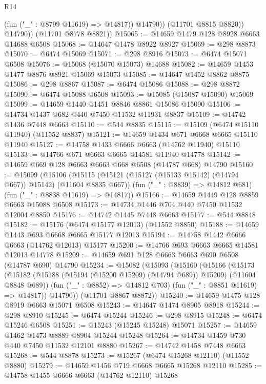\begin{lexlean}{R14}
\begin{coremodule}
                  (fun ("_" : @8799 @11619) => @14817))
                @14790))
            (@11701 @8815 @8820))
          @14790))
      (@11701 @8778 @8821))
@15065 := @14659 @1479 @128 @8928 @6663 @14688 @6508
@15068 := @14647 @1478 @8922 @8927
@15069 := @298 @8873
@15070 := @6474 @15069
@15071 := @298 @8916
@15073 := @6474 @15071 @6508
@15076 := @15068 (@15070 @15073) @14688
@15082 := @14659 @1453 @1477 @8876 @8921 @15069 @15073
@15085 := @14647 @1452 @8862 @8875
@15086 := @298 @8867
@15087 := @6474 @15086
@15088 := @298 @8872
@15090 := @6474 @15088 @6508
@15093 := @15085 (@15087 @15090) @15069
@15099 := @14659 @1440 @1451 @8846 @8861 @15086 @15090
@15106 := @14734 @1437 @682 @440 @7450 @11532 @11931 @8837
@15109 := @14742 @1436 @7448 @6663
@15110 := @544 @8835
@15115 := @15109 (@6474 @15110 @11940) (@11552 @8837)
@15121 := @14659 @1434 @671 @6668 @6665 @15110 @11940
@15127 := @14758 @1433 @6666 @6663 (@14762 @11940) @15110
@15133 := @14766 @671 @6663 @6665 @14581 @11940 @14778
@15142 := @14659 @669 @128 @6663 @6663 @668 @6508 (@14787 @668) @14790
@15160 := @15099
    (@15106
      (@15115 (@15121 (@15127 (@15133 @15142) (@14794 @667)) @15142) (@11604 @8835 @667))
      (fun ("_" : @8839) => @14812 @681)
      (fun ("_" : @8838 @11619) => @14817))
@15166 := @14659 @1449 @128 @8859 @6663 @15088 @6508
@15173 := @14734 @1446 @704 @440 @7450 @11532 @12004 @8850
@15176 := @14742 @1445 @7448 @6663
@15177 := @544 @8848
@15182 := @15176 (@6474 @15177 @12013) (@11552 @8850)
@15188 := @14659 @1443 @693 @6668 @6665 @15177 @12013
@15194 := @14758 @1442 @6666 @6663 (@14762 @12013) @15177
@15200 := @14766 @693 @6663 @6665 @14581 @12013 @14778
@15209 := @14659 @691 @128 @6663 @6663 @690 @6508 (@14787 @690) @14790
@15234 := @15082
    (@15093
      (@15160
        (@15166
          (@15173
            (@15182 (@15188 (@15194 (@15200 @15209) (@14794 @689)) @15209) (@11604 @8848 @689))
            (fun ("_" : @8852) => @14812 @703)
            (fun ("_" : @8851 @11619) => @14817))
          @14790))
      (@11701 @8867 @8872))
@15240 := @14659 @1475 @128 @8919 @6663 @15071 @6508
@15243 := @14647 @1474 @8905 @8918
@15244 := @298 @8910
@15245 := @6474 @15244
@15246 := @298 @8915
@15248 := @6474 @15246 @6508
@15251 := @15243 (@15245 @15248) @15071
@15257 := @14659 @1462 @1473 @8889 @8904 @15244 @15248
@15264 := @14734 @1459 @730 @440 @7450 @11532 @12101 @8880
@15267 := @14742 @1458 @7448 @6663
@15268 := @544 @8878
@15273 := @15267 (@6474 @15268 @12110) (@11552 @8880)
@15279 := @14659 @1456 @719 @6668 @6665 @15268 @12110
@15285 := @14758 @1455 @6666 @6663 (@14762 @12110) @15268

\end{coremodule}
\end{lexlean}
